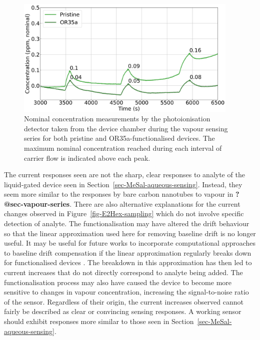 \documentclass[
  a4paper,
]{scrbook}
\begin{document}
\begin{figure}

{\centering \includegraphics[width=0.95\textwidth,height=\textheight]{figures/ch8/input_time_comparison.png}

}

\caption{\label{fig-E2Hex-additions-PID}Nominal concentration
measurements by the photoionisation detector taken from the device
chamber during the vapour sensing series for both pristine and
OR35a-functionalised devices. The maximum nominal concentration reached
during each interval of carrier flow is indicated above each peak.}

\end{figure}

The current responses seen are not the sharp, clear responses to analyte
of the liquid-gated device seen in
Section~\ref{sec-MeSal-aqueous-sensing}. Instead, they seem more similar
to the responses by bare carbon nanotubes to vapour in
\textbf{?@sec-vapour-series}. There are also alternative explanations
for the current changes observed in Figure~\ref{fig-E2Hex-sampling}
which do not involve specific detection of analyte. The
functionalisation may have altered the drift behaviour so that the
linear approximation used here for removing baseline drift is no longer
useful. It may be useful for future works to incorporate computational
approaches to baseline drift compensation if the linear approximation
regularly breaks down for functionalised devices \autocite{Zhang2022}.
The breakdown in this approximation has then led to current increases
that do not directly correspond to analyte being added. The
functionalisation process may also have caused the device to become more
sensitive to changes in vapour concentration, increasing the
signal-to-noise ratio of the sensor. Regardless of their origin, the
current increases observed cannot fairly be described as clear or
convincing sensing responses. A working sensor should exhibit responses
more similar to those seen in Section~\ref{sec-MeSal-aqueous-sensing}.
\end{document}
